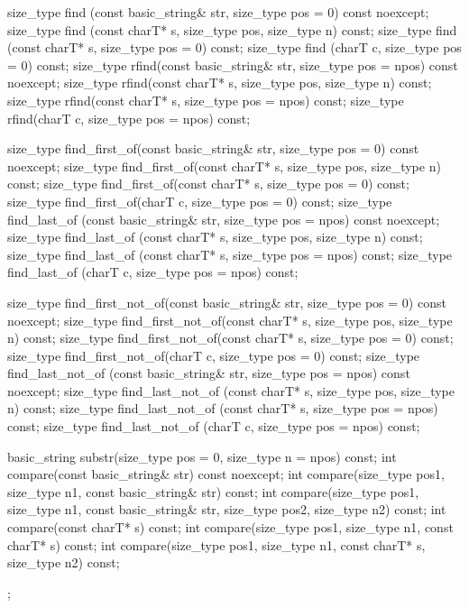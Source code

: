 \begin{codeblock}
{{    size_type find (const basic_string& str, size_type pos = 0) const noexcept;
    size_type find (const charT* s, size_type pos, size_type n) const;
    size_type find (const charT* s, size_type pos = 0) const;
    size_type find (charT c, size_type pos = 0) const;
    size_type rfind(const basic_string& str, size_type pos = npos) const noexcept;
    size_type rfind(const charT* s, size_type pos, size_type n) const;
    size_type rfind(const charT* s, size_type pos = npos) const;
    size_type rfind(charT c, size_type pos = npos) const;

    size_type find_first_of(const basic_string& str,
                            size_type pos = 0) const noexcept;
    size_type find_first_of(const charT* s,
                            size_type pos, size_type n) const;
    size_type find_first_of(const charT* s, size_type pos = 0) const;
    size_type find_first_of(charT c, size_type pos = 0) const;
    size_type find_last_of (const basic_string& str,
                            size_type pos = npos) const noexcept;
    size_type find_last_of (const charT* s,
                            size_type pos, size_type n) const;
    size_type find_last_of (const charT* s, size_type pos = npos) const;
    size_type find_last_of (charT c, size_type pos = npos) const;

    size_type find_first_not_of(const basic_string& str,
                size_type pos = 0) const noexcept;
    size_type find_first_not_of(const charT* s, size_type pos,
                                size_type n) const;
    size_type find_first_not_of(const charT* s, size_type pos = 0) const;
    size_type find_first_not_of(charT c, size_type pos = 0) const;
    size_type find_last_not_of (const basic_string& str,
                                size_type pos = npos) const noexcept;
    size_type find_last_not_of (const charT* s, size_type pos,
                                size_type n) const;
    size_type find_last_not_of (const charT* s,
                                size_type pos = npos) const;
    size_type find_last_not_of (charT c, size_type pos = npos) const;

    basic_string substr(size_type pos = 0, size_type n = npos) const;
    int compare(const basic_string& str) const noexcept;
    int compare(size_type pos1, size_type n1,
                const basic_string& str) const;
    int compare(size_type pos1, size_type n1,
                const basic_string& str,
                size_type pos2, size_type n2) const;
    int compare(const charT* s) const;
    int compare(size_type pos1, size_type n1,
                const charT* s) const;
    int compare(size_type pos1, size_type n1,
                const charT* s, size_type n2) const;
  };
}
\end{codeblock}

